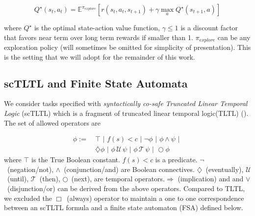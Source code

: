 \documentclass{article}
\newcommand{\Next}{\bigcirc}
\newcommand{\Always}{\Box}
\newcommand{\Event}{\diamondsuit}
\newcommand{\Implies}{\Rightarrow}
\newcommand{\Then}{\mathcal{T}}
\newcommand{\True}{\top}
\begin{document}
\begin{equation}\label{eq2B3}
Q^\star(s_t,a_t) = \mathbb{E}^{\pi_{explore}}[r(s_t, a_t, s_{t+1}) + \gamma \underset{a}{\max}Q^\star(s_{t+1}, a)]
\end{equation}

\noindent where $Q^\star$ is the optimal state-action value function, $\gamma \leq 1$ is a discount factor that favors near term over long term rewards if smaller than 1. $\pi_{explore}$ can be any exploration policy (will sometimes be omitted for simplicity of presentation). This is the setting that we will adopt for the remainder of this work.



\subsection{scTLTL and Finite State Automata}
\label{sec:background_fsa}

We consider tasks specified with \textit{syntactically co-safe Truncated Linear Temporal Logic} (scTLTL) which is a fragment of truncated linear temporal logic(TLTL) (\cite{li2016reinforcement}). The set of allowed operators are 

\begin{equation}\label{eq2A1}
\begin{split}
\phi := \ & \True \,\,|\,\, f(s) < c \,\,| \,\, \neg \phi \,\,|\,\, \phi \wedge \psi \,\,|\,\, \\ & \Event \phi  \,\,|\,\, \phi \, \mathcal{U} \, \psi \,\,|\,\, \phi\, \Then\, \psi \,\,|\,\, \Next \phi \,\, %
\end{split}
\end{equation}
where $\True$ is the True Boolean constant. $f(s) < c$ is a predicate.
$\neg$~(negation/not), $\wedge$~(conjunction/and) are
Boolean connectives.
$\Event$~(eventually),  $\mathcal{U}$~(until), $\Then$~(then), $\Next$~(next),
are temporal operators.$\Implies$ (implication) and and $\vee$~(disjunction/or) can be derived from the above operators. Compared to TLTL, we excluded the $\Always$~(always) operator to maintain a one to one correspondence between an scTLTL formula and a finite state automaton (FSA) defined below.
\end{document}
